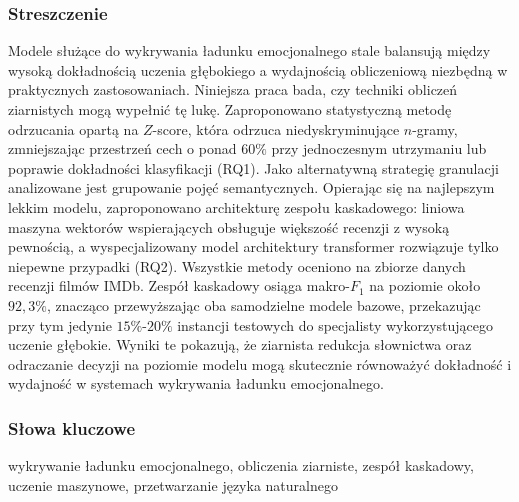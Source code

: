 \documentclass[a4paper,twoside,12pt]{book}
\newcounter{pagesWithoutNumbers}
\newcommand{\zscore}{Z}
\begin{document}
\subsubsection*{Streszczenie} 
\begin{otherlanguage}{polish}
Modele służące do wykrywania ładunku emocjonalnego stale balansują między wysoką dokładnością uczenia głębokiego a wydajnością obliczeniową niezbędną w praktycznych zastosowaniach. Niniejsza praca bada, czy techniki obliczeń ziarnistych mogą wypełnić tę lukę. Zaproponowano statystyczną metodę odrzucania opartą na $\zscore$-score, która odrzuca niedyskryminujące $n$-gramy, zmniejszając przestrzeń cech o ponad $60\%$ przy jednoczesnym utrzymaniu lub poprawie dokładności klasyfikacji (RQ1). Jako alternatywną strategię granulacji analizowane jest grupowanie pojęć semantycznych. Opierając się na najlepszym lekkim modelu, zaproponowano architekturę zespołu kaskadowego: liniowa maszyna wektorów wspierających obsługuje większość recenzji z wysoką pewnością, a wyspecjalizowany model architektury transformer rozwiązuje tylko niepewne przypadki (RQ2). Wszystkie metody oceniono na zbiorze danych recenzji filmów IMDb. Zespół kaskadowy osiąga makro-$F_{1}$ na poziomie około $92{,}3\%$, znacząco przewyższając oba samodzielne modele bazowe, przekazując przy tym jedynie $15\%$-$20\%$ instancji testowych do specjalisty wykorzystującego uczenie głębokie. Wyniki te pokazują, że ziarnista redukcja słownictwa oraz odraczanie decyzji na poziomie modelu mogą skutecznie równoważyć dokładność i wydajność w systemach wykrywania ładunku emocjonalnego.
\end{otherlanguage}

\subsubsection*{Słowa kluczowe} 
\begin{otherlanguage}{polish}
wykrywanie ładunku emocjonalnego, obliczenia ziarniste, zespół kaskadowy, uczenie maszynowe, przetwarzanie języka naturalnego
\end{otherlanguage}

\tableofcontents

\setcounter{pagesWithoutNumbers}{\value{page}}
\mainmatter
\pagestyle{empty}
\end{document}
